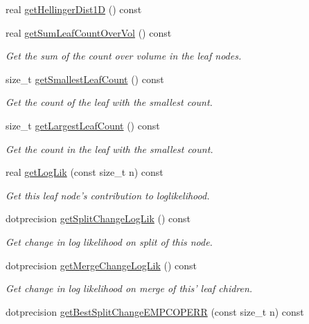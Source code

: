 \begin{DoxyCompactItemize}
real \hyperlink{classsubpavings_1_1SPSnode_afe386393d18f1e251972e959e79c3847}{get\-Hellinger\-Dist1\-D} () const 
\item 
real \hyperlink{classsubpavings_1_1SPSnode_adf589d16a3e20b4285f428c8dc42d75d}{get\-Sum\-Leaf\-Count\-Over\-Vol} () const 
\begin{DoxyCompactList}\small\item\em \-Get the sum of the count over volume in the leaf nodes. \end{DoxyCompactList}\item 
size\-\_\-t \hyperlink{classsubpavings_1_1SPSnode_a6a75d9675312fb76aaf98bbeb084f9d6}{get\-Smallest\-Leaf\-Count} () const 
\begin{DoxyCompactList}\small\item\em \-Get the count of the leaf with the smallest count. \end{DoxyCompactList}\item 
size\-\_\-t \hyperlink{classsubpavings_1_1SPSnode_ae094573d2988d458e00a549039a6ad56}{get\-Largest\-Leaf\-Count} () const 
\begin{DoxyCompactList}\small\item\em \-Get the count in the leaf with the smallest count. \end{DoxyCompactList}\item 
real \hyperlink{classsubpavings_1_1SPSnode_a45f10ce1371120a0c1be29fa0ad8bac5}{get\-Log\-Lik} (const size\-\_\-t n) const 
\begin{DoxyCompactList}\small\item\em \-Get this leaf node's contribution to loglikelihood. \end{DoxyCompactList}\item 
dotprecision \hyperlink{classsubpavings_1_1SPSnode_ab28c35298b721467721228a33a194433}{get\-Split\-Change\-Log\-Lik} () const 
\begin{DoxyCompactList}\small\item\em \-Get change in log likelihood on split of this node. \end{DoxyCompactList}\item 
dotprecision \hyperlink{classsubpavings_1_1SPSnode_a9fd3a2a06ee14b5d5c307a2c7d795cef}{get\-Merge\-Change\-Log\-Lik} () const 
\begin{DoxyCompactList}\small\item\em \-Get change in log likelihood on merge of this' leaf chidren. \end{DoxyCompactList}\item 
dotprecision \hyperlink{classsubpavings_1_1SPSnode_a3b5e815e94d8a276d7b13c0dc25a8dc4}{get\-Best\-Split\-Change\-E\-M\-P\-C\-O\-P\-E\-R\-R} (const size\-\_\-t n) const 

\end{DoxyCompactItemize}
